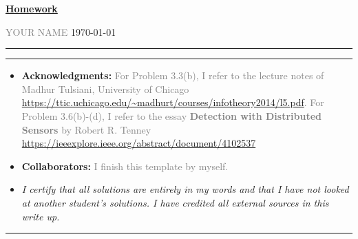 \documentclass[a4paper]{article}
\begin{document}
\courseheader



\setcounter{hwcnt}{3} %

\begin{center}
  \underline{\bf Homework \thehwcnt} \\
\end{center}
\begin{flushleft}
  \textcolor{gray}{YOUR NAME}\hfill
  \today
\end{flushleft}
\hrule

\vspace{2em}

\flushleft
\rule{\textwidth}{1pt}
\begin{itemize}
\item {\bf Acknowledgments: \/} 
  \textcolor{gray}{For Problem 3.3(b), I refer to the lecture notes of  Madhur Tulsiani, University of Chicago \url{https://ttic.uchicago.edu/~madhurt/courses/infotheory2014/l5.pdf}. For Problem 3.6(b)-(d), I refer to the essay \textbf{Detection with Distributed Sensors} by Robert R. Tenney \url{https://ieeexplore.ieee.org/abstract/document/4102537}}

\item {\bf Collaborators: \/}
  \textcolor{gray}{I finish this template by myself.} 

\item  \emph{I certify that all solutions are entirely in my words and that I have not looked at another student's solutions. I have credited all external sources in this write up.}
  \framebox[\linewidth]{\rule{0pt}{10pt}\textcolor{gray}{\large Hanmo Chen}}
\end{itemize}
\rule{\textwidth}{1pt}


\vspace{2em}
\end{document}
